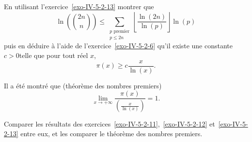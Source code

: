 \begin{exo}
    En utilisant l'exercice~\ref{exo-IV-5-2-13} montrer que
    \[\ln \left( \binom{2n}{n}\right) \leq \sum_{\substack{p \text{ premier} \\ p \leq 2n }} \left\lfloor \frac{\ln(2n)}{\ln(p)} \right\rfloor \ln(p)\] puis en déduire à l'aide de l'exercice~\ref{exo-IV-5-2-6} qu'il existe une constante $c>0$telle que pour tout réel $x$,
    \[\pi(x) \geq c \frac{x}{\ln(x)}.\]
\end{exo}

\begin{exo}
    Il a été montré que (théorème des nombres premiers)
    \[\lim_{x \to + \infty} \frac{\pi(x)}{\left(\frac{x}{\ln(x)}\right)} = 1.\]

    Comparer les résultats des exercices~\ref{exo-IV-5-2-11},~\ref{exo-IV-5-2-12} et~\ref{exo-IV-5-2-13} entre eux, et les comparer le théorème des nombres premiers.
\end{exo}





